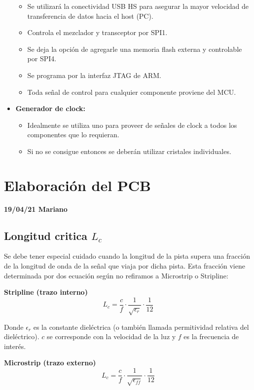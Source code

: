 \documentclass[a4paper,12pt]{report} %
\begin{document}
\begin{itemize}
\begin{itemize}
		\item Se utilizará la conectividad USB HS para asegurar la mayor velocidad de transferencia de datos hacia el host (PC).
		\item Controla el mezclador y transceptor por SPI1.
		\item Se deja la opción de agregarle una memoria flash externa y controlable por SPI4.
		\item Se programa por la interfaz JTAG de ARM.
		\item Toda señal de control para cualquier componente proviene del MCU.
	\end{itemize}
	\item \textbf{Generador de clock:}
	\begin{itemize}
		\item Idealmente se utiliza uno para proveer de señales de clock a todos los componentes que lo requieran.
		\item Si no se consigue entonces se deberán utilizar cristales individuales.
	\end{itemize}
\end{itemize}


\chapter{Elaboración del PCB}
\textbf{19/04/21 Mariano}

\section{Longitud critica $L_c$}

Se debe tener especial cuidado cuando la longitud de la pista supera una fracción de la longitud de onda de la señal que viaja por dicha pista. Esta fracción viene determinada por dos ecuación según no refiramos a Microstrip o Stripline:


\textbf{Stripline (trazo interno)}
\begin{equation}
L_c = \frac{c}{f} \cdot \frac{1}{\sqrt{\epsilon_r}} \cdot \frac{1}{12}
\end{equation}

Donde $\epsilon_r$ es la constante dieléctrica (o también llamada permitividad relativa del dieléctrico). $c$ se corresponde con la velocidad de la luz y $f$ es la frecuencia de interés.

\textbf{Microstrip (trazo externo)}
\begin{equation}
L_c = \frac{c}{f} \cdot \frac{1}{\sqrt{\epsilon_{ff}}} \cdot \frac{1}{12}
\end{equation}
\end{document}
